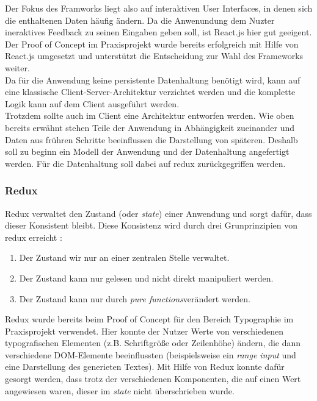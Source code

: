 Der Fokus des Framworks liegt also auf interaktiven User Interfaces, in denen sich die enthaltenen Daten häufig ändern. Da die Anwenundung dem Nuzter ineraktives Feedback zu seinen Eingaben geben soll, ist React.js hier gut geeigent. Der Proof of Concept im Praxisprojekt wurde bereits erfolgreich mit Hilfe von React.js umgesetzt und unterstützt die Entscheidung zur Wahl des Frameworks weiter. \\

Da für die Anwendung keine persistente Datenhaltung benötigt wird, kann auf eine klassische Client-Server-Architektur verzichtet werden und die komplette Logik kann auf dem Client ausgeführt werden.\\
Trotzdem sollte auch im Client eine Architektur entworfen werden. Wie oben bereits erwähnt stehen Teile der Anwendung in Abhängigkeit zueinander und Daten aus frühren Schritte beeinflussen die Darstellung von späteren\footnotemark[1]. Deshalb soll zu beginn ein Modell der Anwendung und der Datenhaltung angefertigt werden. Für die Datenhaltung soll dabei auf redux zurückgegriffen werden.

\subsubsection{Redux}
Redux verwaltet den Zustand (oder \textit{state}) einer Anwendung und sorgt dafür, dass dieser Konsistent bleibt. Diese Konsistenz wird durch drei Grunprinzipien von redux erreicht \cite{threeprinciplesredux}:

\begin{enumerate}
  \item Der Zustand wir nur an einer zentralen Stelle verwaltet.
  \item Der Zustand kann nur gelesen und nicht direkt manipuliert werden.
  \item Der Zustand kann nur durch \textit{pure functions}\footnotemark[2] verändert werden.
\end{enumerate}

Redux wurde bereits beim Proof of Concept für den Bereich Typographie im Praxisprojekt verwendet. Hier konnte der Nutzer Werte von verschiedenen typografischen Elementen (z.B. Schriftgröße oder Zeilenhöhe) ändern, die dann verschiedene DOM-Elemente beeinflussten (beispielsweise ein \textit{range input} und eine Darstellung des generieten Textes). Mit Hilfe von Redux konnte dafür gesorgt werden, dass trotz der verschiedenen Komponenten, die auf einen Wert angewiesen waren, dieser im \textit{state} nicht überschrieben wurde.

